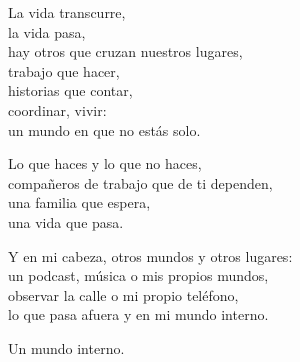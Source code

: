 \begin{lyrics}
La vida transcurre,\\
la vida pasa,\\
hay otros que cruzan nuestros lugares,\\
trabajo que hacer,\\
historias que contar,\\
coordinar, vivir:\\
un mundo en que no estás solo.

Lo que haces y lo que no haces,\\
compañeros de trabajo que de ti dependen,\\
una familia que espera,\\
una vida que pasa.

Y en mi cabeza, otros mundos y otros lugares:\\
un podcast, música o mis propios mundos,\\
observar la calle o mi propio teléfono,\\
lo que pasa afuera y en mi mundo interno.

Un mundo interno.
\end{lyrics}

